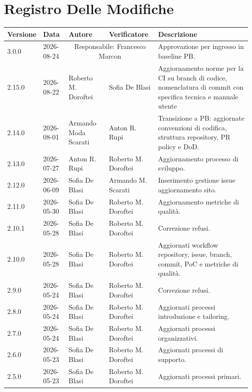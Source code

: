 \section*{Registro Delle Modifiche}

\renewcommand{\arraystretch}{1.5}
\begin{longtable}{>{\ttfamily\small}l l l l p{4cm}}
  \toprule
  \textbf{Versione} & \textbf{Data} & \textbf{Autore}
    & \textbf{Verificatore} & \textbf{Descrizione} \\
  \midrule
  \endhead
  3.0.0 & 2026-08-24 & \multicolumn{2}{c}{Responsabile: Francesco Marcon} & Approvazione per ingresso in baseline PB. \\[4pt]
  2.15.0 & 2026-08-22 & Roberto M. Doroftei & Sofia De Blasi & Aggiornamento norme per la CI su branch di codice, nomenclatura di commit con specifica tecnica e manuale utente \\[4pt]
  2.14.0 & 2026-08-01 & Armando Moda Scarati & Anton R. Rupi & Transizione a PB: aggiornate convenzioni di codifica, struttura repository, PR policy e DoD. \\[4pt]
  2.13.0 & 2026-07-27 & Anton R. Rupi & Roberto M. Doroftei & Aggiornamento processo di sviluppo. \\[4pt]
  2.12.0 & 2026-06-09 & Sofia De Blasi & Armando M. Scarati & Inserimento gestione issue aggiornamento sito. \\[4pt]
  2.11.0 & 2026-05-30 & Sofia De Blasi & Roberto M. Doroftei & Aggiornamento metriche di qualità. \\[4pt]
  2.10.1 & 2026-05-28 & Sofia De Blasi & Roberto M. Doroftei & Correzione refusi. \\[4pt]
  2.10.0 & 2026-05-28 & Sofia De Blasi & Roberto M. Doroftei &  Aggiornati workflow repository, issue, branch, commit, PoC e metriche di qualità.\\[4pt]
  2.9.0 & 2026-05-24 & Sofia De Blasi & Roberto M. Doroftei & Correzione refusi. \\[4pt]
  2.8.0 & 2026-05-24 & Sofia De Blasi & Roberto M. Doroftei & Aggiornati processi introduzione e tailoring. \\[4pt]
  2.7.0 & 2026-05-24 & Sofia De Blasi & Roberto M. Doroftei & Aggiornati processi organizzativi. \\[4pt]
  2.6.0 & 2026-05-23 & Sofia De Blasi & Roberto M. Doroftei & Aggiornati processi di supporto. \\[4pt]
  2.5.0 & 2026-05-23 & Sofia De Blasi & Roberto M. Doroftei & Aggiornati processi primari. \\[4pt]

\end{longtable}
